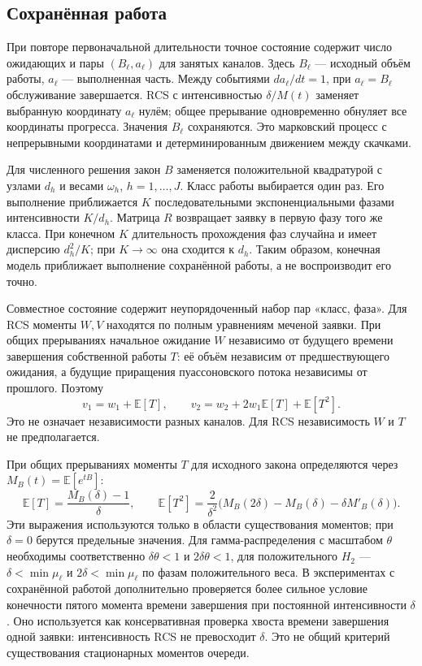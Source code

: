 \subsection{Сохранённая работа}
При повторе первоначальной длительности точное состояние содержит число ожидающих и пары \((B_\ell,a_\ell)\) для занятых каналов. Здесь \(B_\ell\) --- исходный объём работы, \(a_\ell\) --- выполненная часть. Между событиями \(da_\ell/dt=1\), при \(a_\ell=B_\ell\) обслуживание завершается. RCS с интенсивностью \(\delta/M(t)\) заменяет выбранную координату \(a_\ell\) нулём; общее прерывание одновременно обнуляет все координаты прогресса. Значения \(B_\ell\) сохраняются. Это марковский процесс с непрерывными координатами и детерминированным движением между скачками.

Для численного решения закон \(B\) заменяется положительной квадратурой с узлами \(d_h\) и весами \(\omega_h\), \(h=1,\ldots,J\). Класс работы выбирается один раз. Его выполнение приближается \(K\) последовательными экспоненциальными фазами интенсивности \(K/d_h\). Матрица \(R\) возвращает заявку в первую фазу того же класса. При конечном \(K\) длительность прохождения фаз случайна и имеет дисперсию \(d_h^2/K\); при \(K\to\infty\) она сходится к \(d_h\). Таким образом, конечная модель приближает выполнение сохранённой работы, а не воспроизводит его точно.

Совместное состояние содержит неупорядоченный набор пар «класс, фаза». Для RCS моменты \(W,V\) находятся по полным уравнениям меченой заявки. При общих прерываниях начальное ожидание \(W\) независимо от будущего времени завершения собственной работы \(T\): её объём независим от предшествующего ожидания, а будущие приращения пуассоновского потока независимы от прошлого. Поэтому
\[
v_1=w_1+\mathbb E[T],\qquad
v_2=w_2+2w_1\mathbb E[T]+\mathbb E[T^2].
\]
Это не означает независимости разных каналов. Для RCS независимость \(W\) и \(T\) не предполагается.

При общих прерываниях моменты \(T\) для исходного закона определяются через \(M_B(t)=\mathbb E[e^{tB}]\):
\[
\mathbb E[T]=\frac{M_B(\delta)-1}{\delta},\qquad
\mathbb E[T^2]=\frac{2}{\delta^2}\bigl(M_B(2\delta)-M_B(\delta)-\delta M'_B(\delta)\bigr).
\]
Эти выражения используются только в области существования моментов; при \(\delta=0\) берутся предельные значения. Для гамма-распределения с масштабом \(\theta\) необходимы соответственно \(\delta\theta<1\) и \(2\delta\theta<1\), для положительного \(H_2\) --- \(\delta<\min\mu_\ell\) и \(2\delta<\min\mu_\ell\) по фазам положительного веса. В экспериментах с сохранённой работой дополнительно проверяется более сильное условие конечности пятого момента времени завершения при постоянной интенсивности \(\delta\). Оно используется как консервативная проверка хвоста времени завершения одной заявки: интенсивность RCS не превосходит \(\delta\). Это не общий критерий существования стационарных моментов очереди.

